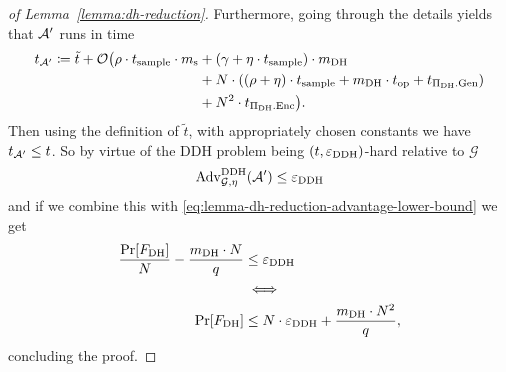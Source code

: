 \begin{proof}[of Lemma~\ref{lemma:dh-reduction}]
	Furthermore, going through the details yields that $\mathcal{A}'$ runs in time
	\begin{align*}
		\begin{split}
			t_{\mathcal{A}'} \coloneqq \tilde{t} + \mathcal{O}\big(\rho \cdot t_{\mathrm{sample}} \cdot m_\mathrm{s} & + (\gamma + \eta \cdot t_{\mathrm{sample}}) \cdot m_\mathrm{DH} \\
			& + N \cdot ((\rho + \eta) \cdot t_{\mathrm{sample}} + m_\mathrm{DH} \cdot t_{\mathrm{op}} + t_{\Pi_{\mathrm{DH}}.\mathrm{Gen}})  \\
			& +  N^2 \cdot t_{\Pi_{\mathrm{DH}}.\mathrm{Enc}}\big).
		\end{split}
	\end{align*}
	Then using the definition of $\tilde{t}$, with appropriately chosen constants we have $t_{\mathcal{A}'} \le t$. So by virtue of the DDH problem being $(t, \varepsilon_\mathrm{DDH})$-hard relative to $\mathcal{G}$
	\[
		\mathrm{Adv}_{\mathcal{G}, \eta}^{\mathrm{DDH}}(\mathcal{A}') \le \varepsilon_\mathrm{DDH}
	\]
	and if we combine this with \eqref{eq:lemma-dh-reduction-advantage-lower-bound} we get
	\begin{align*}
		\frac{\pr{\fdh}}{N} - \frac{\mdh \cdot N}{q} & \le \eddh                                     \\
		                                             & \iff                                          \\
		\pr{\fdh}                                    & \le N \cdot \eddh + \frac{\mdh \cdot N^2}{q},
	\end{align*}
	concluding the proof.
\end{proof}
